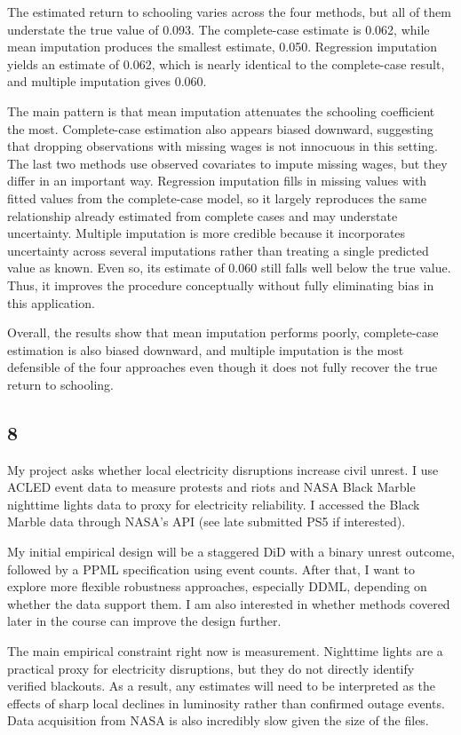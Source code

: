 \documentclass[12pt]{article}
\begin{document}
\noindent The estimated return to schooling varies across the four methods, but all of them understate the true value of 0.093. The complete-case estimate is 0.062, while mean imputation produces the smallest estimate, 0.050. Regression imputation yields an estimate of 0.062, which is nearly identical to the complete-case result, and multiple imputation gives 0.060.

The main pattern is that mean imputation attenuates the schooling coefficient the most. Complete-case estimation also appears biased downward, suggesting that dropping observations with missing wages is not innocuous in this setting. The last two methods use observed covariates to impute missing wages, but they differ in an important way. Regression imputation fills in missing values with fitted values from the complete-case model, so it largely reproduces the same relationship already estimated from complete cases and may understate uncertainty. Multiple imputation is more credible because it incorporates uncertainty across several imputations rather than treating a single predicted value as known. Even so, its estimate of 0.060 still falls well below the true value. Thus, it improves the procedure conceptually without fully eliminating bias in this application.

Overall, the results show that mean imputation performs poorly, complete-case estimation is also biased downward, and multiple imputation is the most defensible of the four approaches even though it does not fully recover the true return to schooling.

\pagebreak

\subsection*{8}

\noindent My project asks whether local electricity disruptions increase civil unrest. I use ACLED event data to measure protests and riots and NASA Black Marble nighttime lights data to proxy for electricity reliability. I accessed the Black Marble data through NASA’s API (see late submitted PS5 if interested).

My initial empirical design will be a staggered DiD with a binary unrest outcome, followed by a PPML specification using event counts. After that, I want to explore more flexible robustness approaches, especially DDML, depending on whether the data support them. I am also interested in whether methods covered later in the course can improve the design further.

The main empirical constraint right now is measurement. Nighttime lights are a practical proxy for electricity disruptions, but they do not directly identify verified blackouts. As a result, any estimates will need to be interpreted as the effects of sharp local declines in luminosity rather than confirmed outage events. Data acquisition from NASA is also incredibly slow given the size of the files. 



\end{document}
